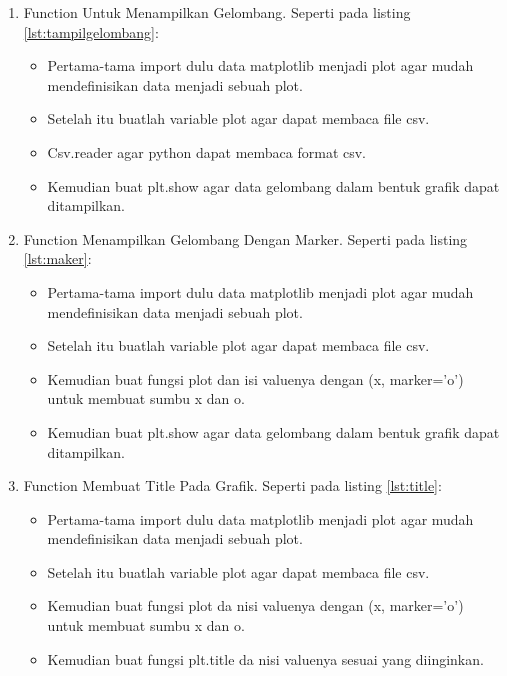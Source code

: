 \begin{enumerate}
\item Function Untuk Menampilkan Gelombang.
Seperti pada listing \ref{lst:tampilgelombang}:

\begin{itemize}
\item Pertama-tama import dulu data matplotlib menjadi plot agar mudah mendefinisikan data menjadi sebuah plot. 
\item Setelah itu buatlah variable plot agar dapat membaca file csv.
\item Csv.reader agar python dapat membaca format csv.
\item Kemudian buat plt.show agar data gelombang dalam bentuk grafik dapat ditampilkan.
\end{itemize}

\item Function Menampilkan Gelombang Dengan Marker.
Seperti pada listing \ref{lst:maker}:

\begin{itemize}
\item Pertama-tama import dulu data matplotlib menjadi plot agar mudah mendefinisikan data menjadi sebuah plot.
\item Setelah itu buatlah variable plot agar dapat membaca file csv.
\item Kemudian buat fungsi plot dan isi valuenya dengan (x, marker=’o’) untuk membuat sumbu x dan o.
\item Kemudian buat plt.show agar data gelombang dalam bentuk grafik dapat ditampilkan.
\end{itemize}

\item Function Membuat Title Pada Grafik.
Seperti pada listing \ref{lst:title}:

\begin{itemize}
\item Pertama-tama import dulu data matplotlib menjadi plot agar mudah mendefinisikan data menjadi sebuah plot. 
\item Setelah itu buatlah variable plot agar dapat membaca file csv.
\item Kemudian buat fungsi plot da nisi valuenya dengan (x, marker=’o’) untuk membuat sumbu x dan o.
\item Kemudian buat fungsi plt.title da nisi valuenya sesuai yang diinginkan.
\end{itemize}


\end{enumerate}
